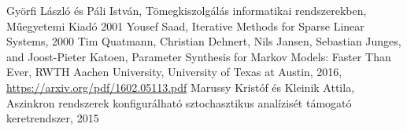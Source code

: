 
\begin{thebibliography}{widestlabel}
	 Györfi László és Páli István, Tömegkiszolgálás informatikai rendszerekben, Műegyetemi Kiadó 2001
	 Yousef Saad, Iterative Methods for Sparse Linear Systems, 2000
	 Tim Quatmann, Christian Dehnert, Nils Jansen,	Sebastian Junges, and Joost-Pieter Katoen, Parameter Synthesis for Markov Models: Faster Than Ever, RWTH Aachen University, University of Texas at Austin, 2016, \url{https://arxiv.org/pdf/1602.05113.pdf}
	 Marussy Kristóf és Kleinik Attila, Aszinkron rendszerek konfigurálható sztochasztikus analízisét támogató keretrendszer, 2015
\end{thebibliography}